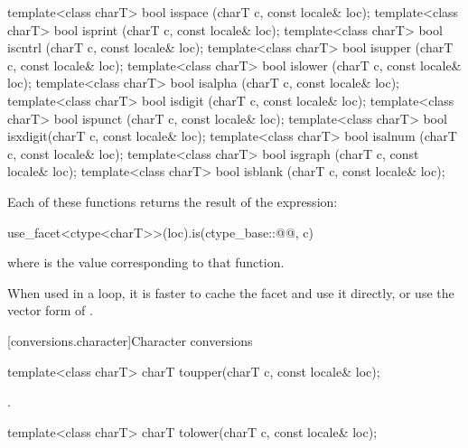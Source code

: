%
%
%
%
%
%
%
%
%
%
%
%
\begin{itemdecl}
template<class charT> bool isspace (charT c, const locale& loc);
template<class charT> bool isprint (charT c, const locale& loc);
template<class charT> bool iscntrl (charT c, const locale& loc);
template<class charT> bool isupper (charT c, const locale& loc);
template<class charT> bool islower (charT c, const locale& loc);
template<class charT> bool isalpha (charT c, const locale& loc);
template<class charT> bool isdigit (charT c, const locale& loc);
template<class charT> bool ispunct (charT c, const locale& loc);
template<class charT> bool isxdigit(charT c, const locale& loc);
template<class charT> bool isalnum (charT c, const locale& loc);
template<class charT> bool isgraph (charT c, const locale& loc);
template<class charT> bool isblank (charT c, const locale& loc);
\end{itemdecl}

\pnum
Each of these functions 
returns the result of the expression:
\begin{codeblock}
use_facet<ctype<charT>>(loc).is(ctype_base::@@, c)
\end{codeblock}
where  is the  value
corresponding to that function.
\begin{footnote}
When used in a loop,
it is faster to cache the  facet and use it directly, or
use the vector form of .
\end{footnote}

[conversions.character]{Character conversions}

%
\begin{itemdecl}
template<class charT> charT toupper(charT c, const locale& loc);
\end{itemdecl}

\begin{itemdescr}
\pnum
\returns
{}.
\end{itemdescr}

%
\begin{itemdecl}
template<class charT> charT tolower(charT c, const locale& loc);
\end{itemdecl}

